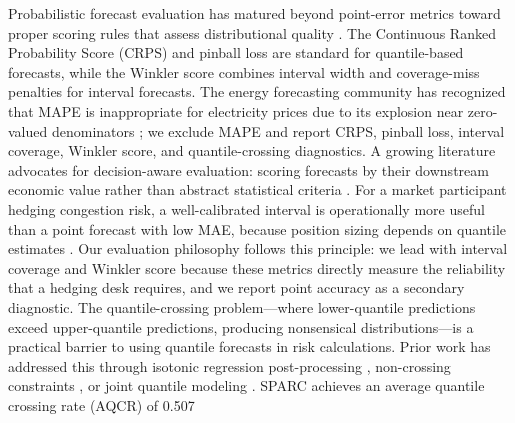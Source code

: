 Probabilistic forecast evaluation has matured beyond point-error metrics toward proper scoring rules that assess distributional quality \cite{gneiting2007strictly}. The Continuous Ranked Probability Score (CRPS) \cite{matheson1976scoring} and pinball loss \cite{koenker1978regression} are standard for quantile-based forecasts, while the Winkler score \cite{winkler1972decision} combines interval width and coverage-miss penalties for interval forecasts. The energy forecasting community has recognized that MAPE is inappropriate for electricity prices due to its explosion near zero-valued denominators \cite{lago2020forecasting}; we exclude MAPE and report CRPS, pinball loss, interval coverage, Winkler score, and quantile-crossing diagnostics.
A growing literature advocates for decision-aware evaluation: scoring forecasts by their downstream economic value rather than abstract statistical criteria \cite{hobbs2022probabilistic, bunn2020statistical}. For a market participant hedging congestion risk, a well-calibrated interval is operationally more useful than a point forecast with low MAE, because position sizing depends on quantile estimates \cite{hirsch2026probabilistic}. Our evaluation philosophy follows this principle: we lead with interval coverage and Winkler score because these metrics directly measure the reliability that a hedging desk requires, and we report point accuracy as a secondary diagnostic.
The quantile-crossing problem---where lower-quantile predictions exceed upper-quantile predictions, producing nonsensical distributions---is a practical barrier to using quantile forecasts in risk calculations. Prior work has addressed this through isotonic regression post-processing \cite{lipiecki2024postprocessing}, non-crossing constraints \cite{chen2025outlieradaptivebased}, or joint quantile modeling \cite{taieb2020hierarchical}. SPARC achieves an average quantile crossing rate (AQCR) of 0.507%
